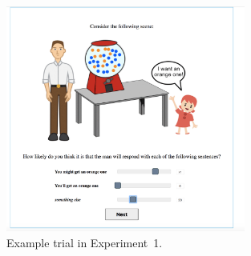 \begin{figure}[th!]
\center
\includegraphics[width=0.7\textwidth, trim={0 0 1.1cm 0},clip]{plots/fig-2-pre-test-example-trial.jpg} 
\caption{Example trial in Experiment~1. \label{fig:norming-trial} }
\end{figure}

